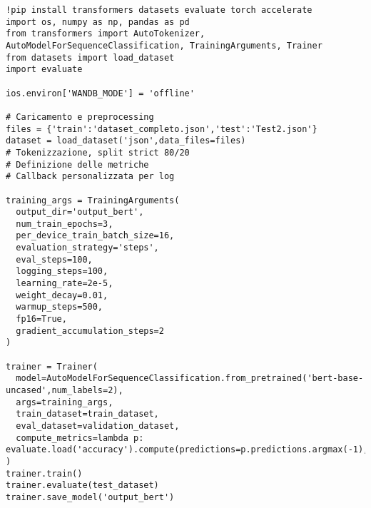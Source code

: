 \documentclass[a4paper,12pt]{article}
\begin{document}
\begin{lstlisting}[caption={Estratto del codice di training BERT-base}]
!pip install transformers datasets evaluate torch accelerate
import os, numpy as np, pandas as pd
from transformers import AutoTokenizer, AutoModelForSequenceClassification, TrainingArguments, Trainer
from datasets import load_dataset
import evaluate

ios.environ['WANDB_MODE'] = 'offline'

# Caricamento e preprocessing
files = {'train':'dataset_completo.json','test':'Test2.json'}
dataset = load_dataset('json',data_files=files)
# Tokenizzazione, split strict 80/20
# Definizione delle metriche
# Callback personalizzata per log

training_args = TrainingArguments(
  output_dir='output_bert',
  num_train_epochs=3,
  per_device_train_batch_size=16,
  evaluation_strategy='steps',
  eval_steps=100,
  logging_steps=100,
  learning_rate=2e-5,
  weight_decay=0.01,
  warmup_steps=500,
  fp16=True,
  gradient_accumulation_steps=2
)

trainer = Trainer(
  model=AutoModelForSequenceClassification.from_pretrained('bert-base-uncased',num_labels=2),
  args=training_args,
  train_dataset=train_dataset,
  eval_dataset=validation_dataset,
  compute_metrics=lambda p: evaluate.load('accuracy').compute(predictions=p.predictions.argmax(-1),references=p.label_ids)
)
trainer.train()
trainer.evaluate(test_dataset)
trainer.save_model('output_bert')
\end{lstlisting}
\end{document}
